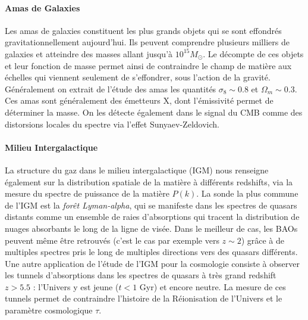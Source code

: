 \paragraph{Amas de Galaxies}
Les amas de galaxies constituent les plus grands objets qui se sont effondrés gravitationnellement aujourd'hui. Ils peuvent comprendre plusieurs milliers de galaxies et atteindre des masses allant jusqu'à $10^{15} M_\odot$. Le décompte de ces objets et leur fonction de masse permet ainsi de contraindre le champ de matière aux échelles qui viennent seulement de s'effondrer, sous l'action de la gravité. Généralement on extrait de l'étude des amas les quantités $\sigma_8\sim 0.8$ et $\Omega_m\sim0.3$. Ces amas sont généralement des émetteurs X, dont l'émissivité permet de déterminer la masse. On les détecte également dans le signal du CMB comme des distorsions locales du spectre via l'effet Sunyaev-Zeldovich.

\paragraph{Milieu Intergalactique}
La structure du gaz dans le milieu intergalactique (IGM) nous renseigne également sur la distribution spatiale de la matière à différents redshifts, via la mesure du spectre de puissance de la matière $P(k)$. La sonde la plus commune de l'IGM est la \textit{forêt Lyman-alpha}, qui se manifeste dans les spectres de quasars distants comme un ensemble de raies d'absorptions qui tracent la distribution de nuages absorbants le long de la ligne de visée. Dans le meilleur de cas, les BAOs peuvent même être retrouvés (c'est le cas par exemple vers $z\sim2$) grâce à de multiples spectres pris le long de multiples directions vers des quasars différents. Une autre application de l'étude de l'IGM pour la cosmologie consiste à observer les tunnels d'absorptions dans les spectres de quasars à très grand redshift $z>5.5$ : l'Univers y est jeune ($t<1$ Gyr) et encore neutre. La mesure de ces tunnels permet de contraindre l'histoire de la Réionisation de l'Univers et le paramètre cosmologique $\tau$.

